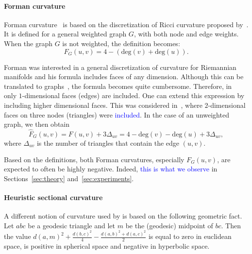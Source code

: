 \documentclass{article} %
\newcommand{\ph}[1]{\textcolor{blue}{#1}}
\begin{document}
\paragraph{Forman curvature}

Forman curvature~\citep{sreejith2016forman} is based on the discretization of Ricci curvature proposed by~\citet{forman2003bochner}. It is defined for a general weighted graph $G$, with both node and edge weights. %
When the graph $G$ is not weighted, 
the definition becomes:
\begin{equation}\label{eq:forman1}
F_G(u,v) 
= 4 - (\mathrm{deg}(v) + \mathrm{deg}(u)).
\end{equation}

Forman was interested in a general discretization of curvature for Riemannian manifolds and his formula includes faces of any dimension. Although this can be translated to graphs~\citep{weber2017coarse}, the formula becomes quite cumbersome. Therefore, in~ only $1$-dimensional faces (edges) are included. One can extend this expression by including higher dimensional faces. This was considered in~\citep{samal2018comparative}, where $2$-dimensional faces on three nodes (triangles) were \ph{included}. In the case of an unweighted graph, we then obtain
\begin{equation}\label{eq:forman2}
	\hat F_G(u,v) = F(u,v) + 3\Delta_{uv} 
	= 4 - \mathrm{deg}(v) - \mathrm{deg}(u) + 3\Delta_{uv},
\end{equation}
where $\Delta_{uv}$ is the number of triangles that contain the edge $(u,v)$. 

Based on the definitions, both Forman curvatures, especially $F_G(u,v)$, are expected to often be highly negative. Indeed, \ph{this is what we observe} in Sections~\ref{sec:theory} and~\ref{sec:experiments}.

\paragraph{Heuristic sectional curvature}

A different notion of curvature used by \citet{gu2019learning} is based on the following geometric fact. 
Let $abc$ be a geodesic triangle and let $m$ be the (geodesic) midpoint of $bc$. Then the value
$	d(a,m)^2 + \frac{d(b,c)^2}{4} - \frac{d(a,b)^2 + d(a,c)^2}{2}$
is equal to zero in euclidean space, is positive in spherical space and negative in hyperbolic space.
\end{document}
